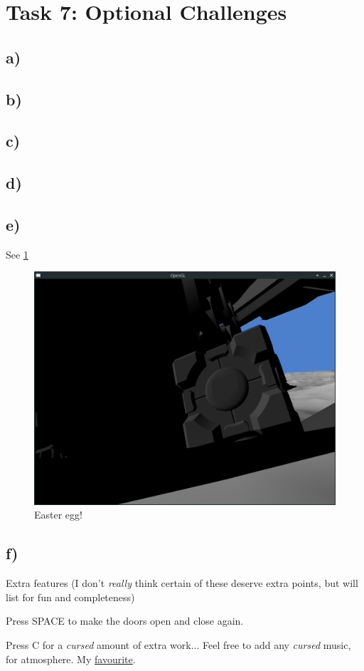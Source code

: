 \section{Task 7: Optional Challenges}
\subsection{a)}

\subsection{b)}

\subsection{c)}

\subsection{d)}

\subsection{e)}
See \cref{fig:task7e}
\begin{figure}[tp]
	\centering
	\includegraphics[width=1.00\textwidth]{figures/task7e}
	\caption{Easter egg!}
\label{fig:task7e}
\end{figure}

\subsection{f)}
Extra features (I don't \textit{really} think certain of these deserve extra points, but will list for fun and completeness)

Press SPACE to make the doors open and close again. 

Press C for a \textit{cursed} amount of extra work... Feel free to add any \textit{cursed} music, for atmosphere. My \href{https://www.youtube.com/watch?v=eY52Zsg-KVI}{favourite}.
